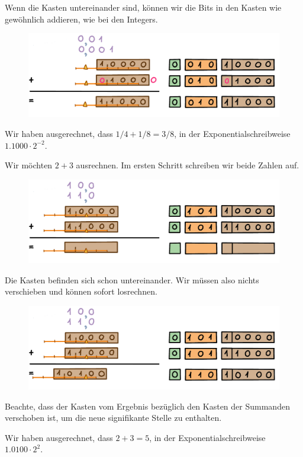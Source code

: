 \begin{beispiel}
Wenn die Kasten untereinander sind, können wir die Bits in den Kasten wie gewöhnlich addieren, wie bei den Integers.
\begin{figure}[H]
\centering
\includegraphics[width=\linewidth]{Pictures/Addition1-4and1-8_3.png}
\end{figure}
Wir haben ausgerechnet, dass \(1/4 + 1/8 = 3/8\), in der Exponentialschreibweise \(1.1000 \cdot 2^{-2}\).
\end{beispiel}

\begin{beispiel}
Wir möchten \(2+3\) ausrechnen. Im ersten Schritt schreiben wir beide Zahlen auf.
\begin{figure}[H]
\centering
\includegraphics[width=\linewidth]{Pictures/Addition2and3_1.png}
\end{figure}
Die Kasten befinden sich schon untereinander. Wir müssen also nichts verschieben und können sofort losrechnen.
\begin{figure}[H]
\centering
\includegraphics[width=\linewidth]{Pictures/Addition2and3_2.png}
\end{figure}
Beachte, dass der Kasten vom Ergebnis bezüglich den Kasten der Summanden verschoben ist, um die neue signifikante Stelle zu enthalten.

Wir haben ausgerechnet, dass \(2 + 3 = 5\), in der Exponentialschreibweise \(1.0100 \cdot 2^2\).
\end{beispiel}

